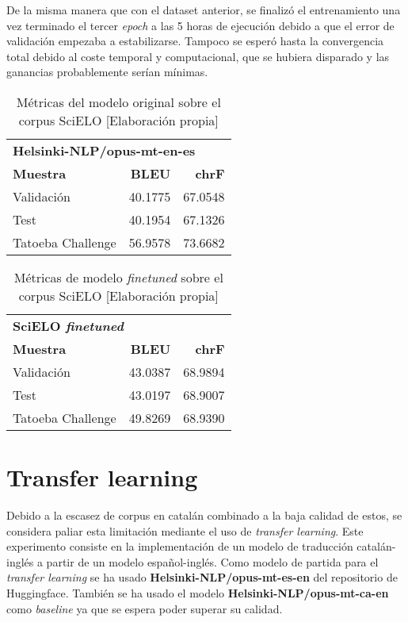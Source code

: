 De la misma manera que con el dataset anterior, se finalizó el entrenamiento una vez terminado el tercer \textit{epoch} a las 5 horas de ejecución debido a que el error de validación empezaba a estabilizarse. Tampoco se esperó hasta la convergencia total debido al coste temporal y computacional, que se hubiera disparado y las ganancias probablemente serían mínimas.

\begin{table}[H]
    \begin{center}
        \begin{tabular}{ l r r }
        \multicolumn{3}{l}{\textbf{Helsinki-NLP/opus-mt-en-es}}\\
        \textbf{Muestra} & \textbf{BLEU} & \textbf{chrF} \\
        Validación & 40.1775 & 67.0548 \\ %
        Test & 40.1954 & 67.1326 \\
        Tatoeba Challenge & 56.9578 & 73.6682
        \end{tabular}
        \caption{Métricas del modelo original sobre el corpus SciELO [Elaboración propia]}\label{originalscielo}
    \end{center}
\end{table}

\begin{table}[H]
    \begin{center}
        \begin{tabular}{ l r r }
        \multicolumn{3}{l}{\textbf{SciELO \textit{finetuned}}}\\
        \textbf{Muestra} & \textbf{BLEU} & \textbf{chrF} \\
        Validación & 43.0387 & 68.9894 \\
        Test & 43.0197 & 68.9007 \\
        Tatoeba Challenge & 49.8269 & 68.9390
        \end{tabular}
        \caption{Métricas de modelo \textit{finetuned} sobre el corpus SciELO [Elaboración propia]}\label{finetunescielo}
    \end{center}
\end{table}


\section{Transfer learning}
Debido a la escasez de corpus en catalán combinado a la baja calidad de estos, se considera paliar esta limitación mediante el uso de \textit{transfer learning}.
Este experimento consiste en la implementación de un modelo de traducción catalán-inglés a partir de un modelo español-inglés.
Como modelo de partida para el \textit{transfer learning} se ha usado \textbf{Helsinki-NLP/opus-mt-es-en} del repositorio de Huggingface. También se ha usado el modelo \textbf{Helsinki-NLP/opus-mt-ca-en} como \textit{baseline} ya que se espera poder superar su calidad.


